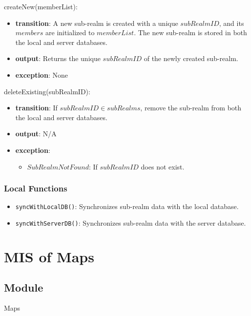 \documentclass[12pt, titlepage]{article}
\begin{document}
\noindent createNew(memberList):
\begin{itemize}
  \item \textbf{transition}:
        A new sub-realm is created with a unique \( subRealmID \), and its \( members \) are initialized to \( memberList \).
        The new sub-realm is stored in both the local and server databases.
  \item \textbf{output}: Returns the unique \( subRealmID \) of the newly created sub-realm.
  \item \textbf{exception}: None
\end{itemize}

\noindent deleteExisting(subRealmID):
\begin{itemize}
  \item \textbf{transition}:
        If \( subRealmID \in subRealms \), remove the sub-realm from both the local and server databases.
  \item \textbf{output}: N/A
  \item \textbf{exception}:
        \begin{itemize}
          \item \( SubRealmNotFound \): If \( subRealmID \) does not exist.
        \end{itemize}
\end{itemize}

\subsubsection{Local Functions}

\begin{itemize}
  \item \texttt{syncWithLocalDB()}: Synchronizes sub-realm data with the local database.
  \item \texttt{syncWithServerDB()}: Synchronizes sub-realm data with the server database.
\end{itemize}

\newpage

\section{MIS of Maps} \label{maps}

\subsection{Module}

Maps
\end{document}
